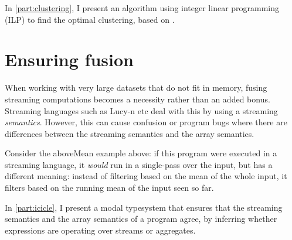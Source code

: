 In \cref{part:clustering}, I present an algorithm using integer linear programming (ILP) to find the optimal clustering, based on \citet{megiddo1998optimal}.

\section{Ensuring fusion}

When working with very large datasets that do not fit in memory, fusing streaming computations becomes a necessity rather than an added bonus.
Streaming languages such as Lucy-n etc deal with this by using a streaming \emph{semantics}.
However, this can cause confusion or program bugs where there are differences between the streaming semantics and the array semantics.

Consider the aboveMean example above: if this program were executed in a streaming language, it \emph{would} run in a single-pass over the input, but has a different meaning: instead of filtering based on the mean of the whole input, it filters based on the running mean of the input seen so far.

In \cref{part:icicle}, I present a modal typesystem that ensures that the streaming semantics and the array semantics of a program agree, by inferring whether expressions are operating over streams or aggregates.

